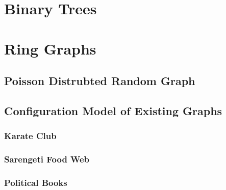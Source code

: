 \documentclass[twocolumn,twoside]{IEEEtran}
\begin{document}
\break
\section*{Binary Trees}


\break
\section*{Ring Graphs}


\subsection*{Poisson Distrubted Random Graph}

\subsection*{Configuration Model of Existing Graphs}

\subsubsection*{Karate Club}

\subsubsection*{Sarengeti Food Web}

\subsubsection*{Political Books}
\end{document}
